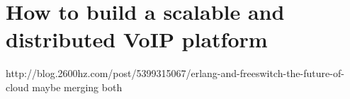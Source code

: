 \chapter{How to build a scalable and distributed VoIP platform}
\label{ch:platform}
http://blog.2600hz.com/post/5399315067/erlang-and-freeswitch-the-future-of-cloud
maybe merging both